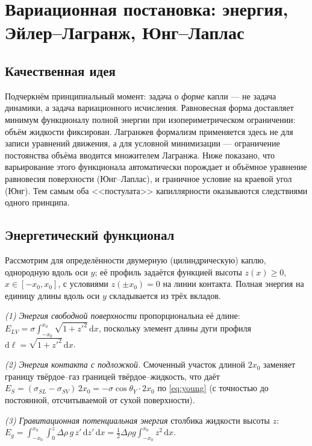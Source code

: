 \documentclass[11pt]{article}
\newcommand{\rd}{\mathrm{d}}
\newcommand{\thY}{\theta_{Y}}
\theoremstyle{definition}
\begin{document}
\section{Вариационная постановка: энергия, Эйлер--Лагранж, Юнг--Лаплас}
\label{sec:variational}

\subsection{Качественная идея}
Подчеркнём принципиальный момент: задача о \emph{форме} капли --- не задача
динамики, а задача вариационного исчисления. Равновесная форма доставляет минимум
функционалу полной энергии при изопериметрическом ограничении: объём жидкости
фиксирован. Лагранжев формализм применяется здесь не для записи уравнений движения,
а для условной минимизации --- ограничение постоянства объёма вводится множителем
Лагранжа. Ниже показано, что варьирование этого функционала автоматически
порождает и объёмное уравнение равновесия поверхности (Юнг--Лаплас), и граничное
условие на краевой угол (Юнг). Тем самым оба <<постулата>> капиллярности
оказываются следствиями одного принципа.

\subsection{Энергетический функционал}
Рассмотрим для определённости двумерную (цилиндрическую) каплю, однородную вдоль
оси $y$; её профиль задаётся функцией высоты $z(x)\ge 0$, $x\in[-x_{0},x_{0}]$,
с условиями $z(\pm x_{0})=0$ на линии контакта. Полная энергия на единицу длины
вдоль оси $y$ складывается из трёх вкладов.

\emph{(1) Энергия свободной поверхности} пропорциональна её длине:
$E_{LV}=\sigma\int_{-x_0}^{x_0}\sqrt{1+z'^{2}}\,\rd x$, поскольку элемент длины
дуги профиля $\rd\ell=\sqrt{1+z'^{2}}\,\rd x$.

\emph{(2) Энергия контакта с подложкой.} Смоченный участок длиной $2x_0$ заменяет
границу твёрдое--газ границей твёрдое--жидкость, что даёт
$E_{S}=(\sigma_{SL}-\sigma_{SV})\,2x_0=-\sigma\cos\thY\cdot 2x_0$ по
\eqref{eq:young} (с точностью до постоянной, отсчитываемой от сухой поверхности).

\emph{(3) Гравитационная потенциальная энергия} столбика жидкости высоты $z$:
$E_{g}=\int_{-x_0}^{x_0}\!\int_0^{z}\Delta\rho\, g\, z'\,\rd z'\,\rd x
=\tfrac12\Delta\rho g\int_{-x_0}^{x_0} z^{2}\,\rd x$.
\end{document}
